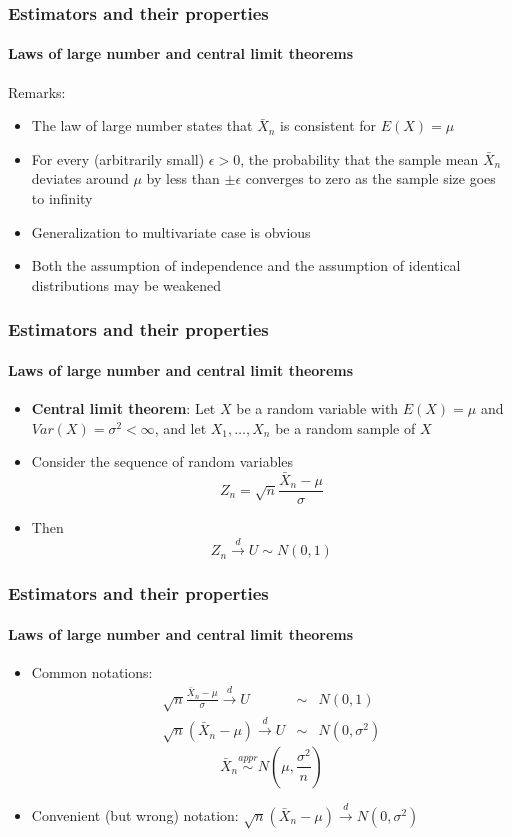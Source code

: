 \documentclass[notes=show]{beamer}
\begin{document}
\begin{frame}\frametitle{Estimators and their properties}\framesubtitle{Laws of large number and central limit theorems}
Remarks:
\begin{itemize}
    \item The law of large number states that $\bar{X}_{n}$ is consistent for $E(X)=\mu $
    \item For every (arbitrarily small) $\epsilon >0$, the probability that the sample mean $\bar{X}_{n}$ deviates around $\mu $ by less than $\pm \epsilon $ converges to zero as the sample size goes to infinity
    \item Generalization to multivariate case is obvious
    \item Both the assumption of independence and the assumption of identical distributions may be weakened
\end{itemize}
\end{frame}


\begin{frame}\frametitle{Estimators and their properties}\framesubtitle{Laws of large number and central limit theorems}
\begin{itemize}
    \item \textbf{Central limit theorem}: Let $X$ be a random variable with $E(X)=\mu $ and $Var(X)=\sigma ^{2}<\infty $, and let $X_{1},\ldots ,X_{n}$ be a random sample of $X$
    \item Consider the sequence of random variables
    \begin{equation*}
        Z_{n}=\sqrt{n}\frac{\bar{X}_{n}-\mu }{\sigma }
    \end{equation*}
    \item Then
    \begin{equation*}
        Z_{n}\overset{d}{\rightarrow }U\sim N(0,1)
    \end{equation*}
\end{itemize}
\end{frame}

\begin{frame}\frametitle{Estimators and their properties}\framesubtitle{Laws of large number and central limit theorems}
\begin{itemize}
    \item Common notations:
    \begin{eqnarray*}
        \sqrt{n}\frac{\bar{X}_{n}-\mu }{\sigma }\overset{d}{\rightarrow }U &\sim &N(0,1) \\
        \sqrt{n}\left( \bar{X}_{n}-\mu \right) \overset{d}{\rightarrow }U &\sim &N(0,\sigma ^{2})
    \end{eqnarray*}
    \begin{equation*}
        \bar{X}_{n}\overset{appr}{\sim }N\left( \mu ,\frac{\sigma ^{2}}{n}\right)
    \end{equation*}
    \item Convenient (but wrong) notation: $\sqrt{n}\left( \bar{X}_{n}-\mu \right) \overset{d}{\rightarrow }N(0,\sigma ^{2})$
\end{itemize}
\end{frame}
\end{document}
